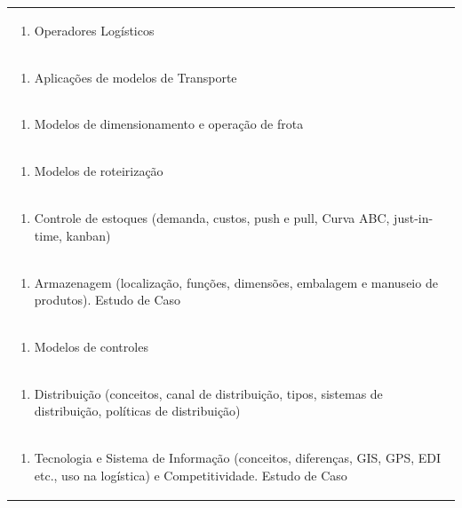 \documentclass[11pt]{article}
\begin{document}
\begin{center}
\begin{longtable}{|p{4cm}|p{4cm}|p{4cm}|p{4cm}|}
\multicolumn{4}{|p{\dimexpr 16cm + 6\tabcolsep\relax}|}{\begin{enumerate}[start=8]\item Operadores Logísticos\end{enumerate}}\\
\multicolumn{4}{|p{\dimexpr 16cm + 6\tabcolsep\relax}|}{\begin{enumerate}[start=9]\item Aplicações de modelos de Transporte\end{enumerate}}\\
\multicolumn{4}{|p{\dimexpr 16cm + 6\tabcolsep\relax}|}{\begin{enumerate}[start=10]\item Modelos de dimensionamento e operação de frota\end{enumerate}}\\
\multicolumn{4}{|p{\dimexpr 16cm + 6\tabcolsep\relax}|}{\begin{enumerate}[start=11]\item Modelos de roteirização\end{enumerate}}\\
\multicolumn{4}{|p{\dimexpr 16cm + 6\tabcolsep\relax}|}{\begin{enumerate}[start=12]\item Controle de estoques (demanda, custos, push e pull, Curva ABC, just-in-time, kanban)\end{enumerate}}\\
\multicolumn{4}{|p{\dimexpr 16cm + 6\tabcolsep\relax}|}{\begin{enumerate}[start=13]\item Armazenagem (localização, funções, dimensões, embalagem e manuseio de produtos). Estudo de Caso\end{enumerate}}\\
\multicolumn{4}{|p{\dimexpr 16cm + 6\tabcolsep\relax}|}{\begin{enumerate}[start=14]\item Modelos de controles\end{enumerate}}\\
\multicolumn{4}{|p{\dimexpr 16cm + 6\tabcolsep\relax}|}{\begin{enumerate}[start=15]\item Distribuição (conceitos, canal de distribuição, tipos, sistemas de distribuição, políticas de distribuição)\end{enumerate}}\\
\multicolumn{4}{|p{\dimexpr 16cm + 6\tabcolsep\relax}|}{\begin{enumerate}[start=16]\item Tecnologia e Sistema de Informação (conceitos, diferenças, GIS, GPS, EDI etc., uso na logística) e Competitividade. Estudo de Caso\end{enumerate}}\\

\end{longtable}
\end{center}
\end{document}
